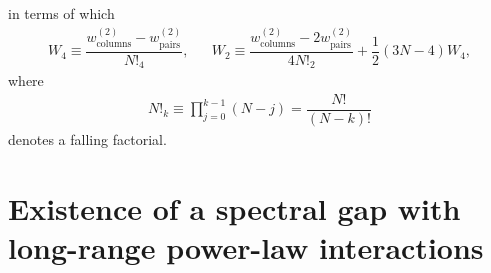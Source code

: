\documentclass[nofootinbib,notitlepage,11pt]{revtex4-2}
\renewcommand{\t}{\text} %
\newcommand{\f}[2]{\dfrac{#1}{#2}} %
\newcommand{\p}[1]{\left(#1\right)} %
\newcommand{\1}{\mathds{1}}
\begin{document}
in terms of which
\begin{align}
  W_4 \equiv \f{w_{\t{columns}}^{(2)} - w_{\t{pairs}}^{(2)}}{N!_4},
  &&
  W_2 \equiv \f{w_{\t{columns}}^{(2)} - 2 w_{\t{pairs}}^{(2)}}
  {4N!_2} + \f12 \p{3N-4} W_4,
\end{align}
where
\begin{align}
  N!_k \equiv \prod_{j=0}^{k-1} \p{N-j} = \f{N!}{\p{N-k}!}
\end{align}
denotes a falling factorial.

\newpage
\appendix

\section{Existence of a spectral gap with long-range power-law
  interactions}
\label{sec:spectral_gap}
\end{document}
